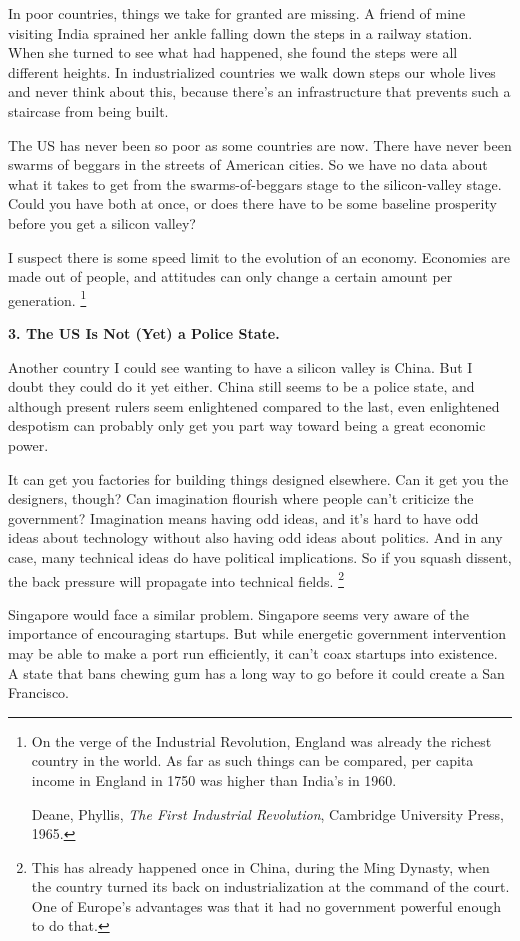 In poor countries, things we take for granted are missing. A friend of
mine visiting India sprained her ankle falling down the steps in a
railway station. When she turned to see what had happened, she found the
steps were all different heights. In industrialized countries we walk
down steps our whole lives and never think about this, because there's
an infrastructure that prevents such a staircase from being built.

The US has never been so poor as some countries are now. There have
never been swarms of beggars in the streets of American cities. So we
have no data about what it takes to get from the swarms-of-beggars stage
to the silicon-valley stage. Could you have both at once, or does there
have to be some baseline prosperity before you get a silicon valley?

I suspect there is some speed limit to the evolution of an economy.
Economies are made out of people, and attitudes can only change a
certain amount per generation. \footnote{On the verge of the Industrial Revolution, England was already
the richest country in the world. As far as such things can be compared,
per capita income in England in 1750 was higher than India's in 1960.

Deane, Phyllis, \emph{The First Industrial Revolution}, Cambridge
University Press, 1965.}

\textbf{3. The US Is Not (Yet) a Police State.}

Another country I could see wanting to have a silicon valley is China.
But I doubt they could do it yet either. China still seems to be a
police state, and although present rulers seem enlightened compared to
the last, even enlightened despotism can probably only get you part way
toward being a great economic power.

It can get you factories for building things designed elsewhere. Can it
get you the designers, though? Can imagination flourish where people
can't criticize the government? Imagination means having odd ideas, and
it's hard to have odd ideas about technology without also having odd
ideas about politics. And in any case, many technical ideas do have
political implications. So if you squash dissent, the back pressure will
propagate into technical fields. \footnote{This has already happened once in China, during the Ming
Dynasty, when the country turned its back on industrialization at the
command of the court. One of Europe's advantages was that it had no
government powerful enough to do that.}

Singapore would face a similar problem. Singapore seems very aware of
the importance of encouraging startups. But while energetic government
intervention may be able to make a port run efficiently, it can't coax
startups into existence. A state that bans chewing gum has a long way to
go before it could create a San Francisco.

